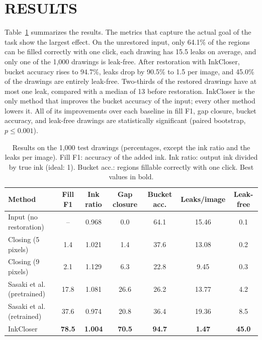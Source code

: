 \documentclass{IEEEcsmag}
\begin{document}
\section{RESULTS}

Table~\ref{tab:results} summarizes the results. The metrics that capture the actual
goal of the task show the largest effect. On the unrestored input, only 64.1\% of the
regions can be filled correctly with one click, each drawing has 15.5 leaks on
average, and only one of the 1,000 drawings is leak-free. After restoration with
InkCloser, bucket accuracy rises to 94.7\%, leaks drop by 90.5\% to 1.5 per image, and
45.0\% of the drawings are entirely leak-free. Two-thirds of the restored drawings
have at most one leak, compared with a median of 13 before restoration. InkCloser is
the only method that improves the bucket accuracy of the input; every other method
lowers it. All of its improvements over each baseline in fill F1, gap closure, bucket
accuracy, and leak-free drawings are statistically significant (paired bootstrap,
$p\le 0.001$).

\begin{table}
\caption{Results on the 1,000 test drawings (percentages, except the ink ratio and
the leaks per image). Fill F1: accuracy of the added ink. Ink ratio: output ink
divided by true ink (ideal: 1). Bucket acc.: regions fillable correctly with one
click. Best values in bold.}
\label{tab:results}
\tablefont
\begin{tabular*}{\textwidth}{@{\extracolsep{\fill}}lcccccc@{}}
\toprule
Method & Fill F1 & Ink ratio & Gap closure & Bucket acc. & Leaks/image & Leak-free \\
\midrule
Input (no restoration)      & --            & 0.968          & 0.0           & 64.1          & 15.46         & 0.1 \\
Closing (5 pixels)          & 1.4           & 1.021          & 1.4           & 37.6          & 13.08         & 0.2 \\
Closing (9 pixels)          & 2.1           & 1.129          & 6.3           & 22.8          & 9.45          & 0.3 \\
Sasaki et al. (pretrained)  & 17.8          & 1.081          & 26.6          & 26.2          & 13.77         & 4.2 \\
Sasaki et al. (retrained)   & 37.6          & 0.974          & 20.8          & 36.4          & 19.36         & 8.5 \\
InkCloser                   & \textbf{78.5} & \textbf{1.004} & \textbf{70.5} & \textbf{94.7} & \textbf{1.47} & \textbf{45.0} \\
\bottomrule
\end{tabular*}
\end{table}
\end{document}
